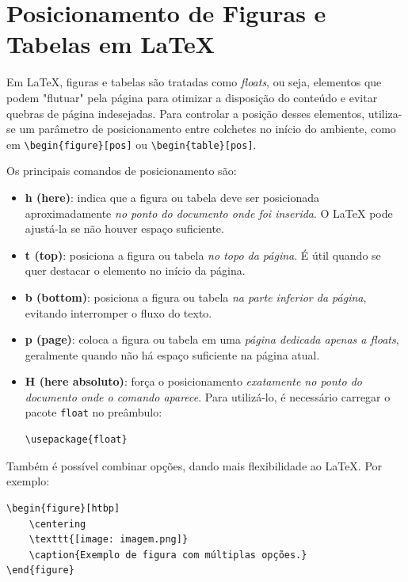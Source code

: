 \section{Posicionamento de Figuras e Tabelas em \LaTeX}

Em \LaTeX, figuras e tabelas são tratadas como \emph{floats}, ou seja, elementos que podem "flutuar" pela página para otimizar a disposição do conteúdo e evitar quebras de página indesejadas. Para controlar a posição desses elementos, utiliza-se um parâmetro de posicionamento entre colchetes no início do ambiente, como em \verb|\begin{figure}[pos]| ou \verb|\begin{table}[pos]|.  

Os principais comandos de posicionamento são:

\begin{itemize}
    \item \textbf{h (here)}: indica que a figura ou tabela deve ser posicionada aproximadamente \emph{no ponto do documento onde foi inserida}. O LaTeX pode ajustá-la se não houver espaço suficiente.
    
    \item \textbf{t (top)}: posiciona a figura ou tabela \emph{no topo da página}. É útil quando se quer destacar o elemento no início da página.
    
    \item \textbf{b (bottom)}: posiciona a figura ou tabela \emph{na parte inferior da página}, evitando interromper o fluxo do texto.
    
    \item \textbf{p (page)}: coloca a figura ou tabela em uma \emph{página dedicada apenas a floats}, geralmente quando não há espaço suficiente na página atual.
    
    \item \textbf{H (here absoluto)}: força o posicionamento \emph{exatamente no ponto do documento onde o comando aparece}. Para utilizá-lo, é necessário carregar o pacote \texttt{float} no preâmbulo:
    \begin{verbatim}
\usepackage{float}
    \end{verbatim}
\end{itemize}

Também é possível combinar opções, dando mais flexibilidade ao LaTeX. Por exemplo:
\begin{verbatim}
\begin{figure}[htbp]
    \centering
    \texttt{[image: imagem.png]}
    \caption{Exemplo de figura com múltiplas opções.}
\end{figure}
\end{verbatim}

